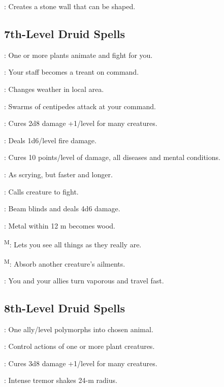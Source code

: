 : Creates a stone wall that can be shaped.



\subsection{7th-Level Druid Spells}

: One or more plants animate and fight for you.

: Your staff becomes a treant on command.

: Changes weather in local area.

: Swarms of centipedes attack at your command.

: Cures 2d8 damage +1/level for many creatures.

: Deals 1d6/level fire damage.

: Cures 10 points/level of damage, all diseases and mental conditions.

: As scrying, but faster and longer.

: Calls creature to fight.

: Beam blinds and deals 4d6 damage.

: Metal within 12 m becomes wood.

\textsuperscript{M}: Lets you see all things as they really are.

\textsuperscript{M}: Absorb another creature's ailments.

: You and your allies turn vaporous and travel fast.



\subsection{8th-Level Druid Spells}

: One ally/level polymorphs into chosen animal.

: Control actions of one or more plant creatures.

: Cures 3d8 damage +1/level for many creatures.

: Intense tremor shakes 24-m radius.

